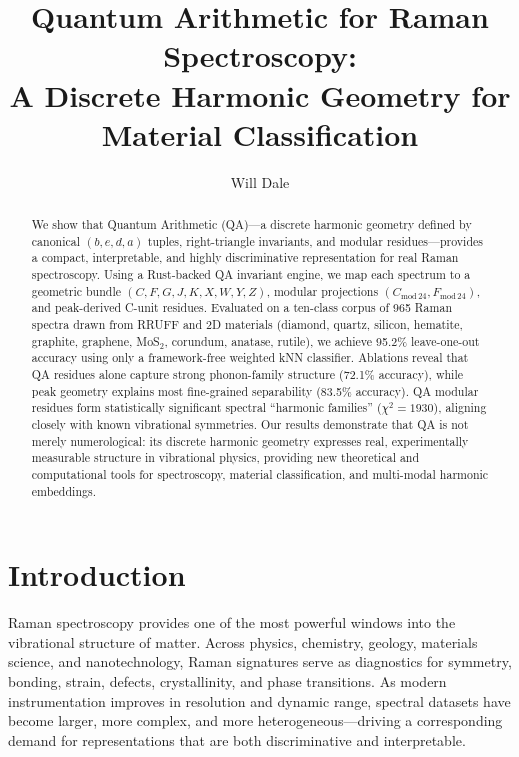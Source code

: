\documentclass[12pt]{article}
\title{Quantum Arithmetic for Raman Spectroscopy:\\A Discrete Harmonic Geometry for Material Classification}
\author{Will Dale}
\date{}
\begin{document}
\maketitle

\begin{abstract}
We show that Quantum Arithmetic (QA)—a discrete harmonic geometry defined by canonical $(b,e,d,a)$ tuples,
right-triangle invariants, and modular residues—provides a compact, interpretable, and highly discriminative
representation for real Raman spectroscopy. Using a Rust-backed QA invariant engine, we map each spectrum to a
geometric bundle $(C,F,G,J,K,X,W,Y,Z)$, modular projections $(C_{\mathrm{mod}\,24},F_{\mathrm{mod}\,24})$, and
peak-derived C-unit residues. Evaluated on a ten-class corpus of 965 Raman spectra drawn from RRUFF and 2D
materials (diamond, quartz, silicon, hematite, graphite, graphene, MoS$_2$, corundum, anatase, rutile), we
achieve 95.2\% leave-one-out accuracy using only a framework-free weighted kNN classifier. Ablations reveal
that QA residues alone capture strong phonon-family structure (72.1\% accuracy), while peak geometry explains
most fine-grained separability (83.5\% accuracy). QA modular residues form statistically significant
spectral ``harmonic families'' ($\chi^2 = 1930$), aligning closely with known vibrational symmetries. Our
results demonstrate that QA is not merely numerological: its discrete harmonic geometry expresses real,
experimentally measurable structure in vibrational physics, providing new theoretical and computational
tools for spectroscopy, material classification, and multi-modal harmonic embeddings.
\end{abstract}

\section{Introduction}
\label{sec:intro}

Raman spectroscopy provides one of the most powerful windows into the vibrational structure of matter.
Across physics, chemistry, geology, materials science, and nanotechnology, Raman signatures serve as
diagnostics for symmetry, bonding, strain, defects, crystallinity, and phase transitions. As modern
instrumentation improves in resolution and dynamic range, spectral datasets have become larger, more
complex, and more heterogeneous—driving a corresponding demand for representations that are both
discriminative and interpretable.  
\end{document}
